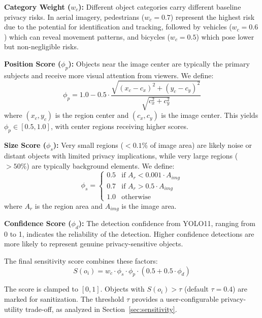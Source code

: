 \documentclass[preprint,12pt]{elsarticle}
\begin{document}
\textbf{Category Weight ($w_c$):} Different object categories carry different baseline privacy risks. In aerial imagery, pedestrians ($w_c = 0.7$) represent the highest risk due to the potential for identification and tracking, followed by vehicles ($w_c = 0.6$) which can reveal movement patterns, and bicycles ($w_c = 0.5$) which pose lower but non-negligible risks.

\textbf{Position Score ($\phi_p$):} Objects near the image center are typically the primary subjects and receive more visual attention from viewers. We define:
\begin{equation}
\phi_p = 1.0 - 0.5 \cdot \frac{\sqrt{(x_c - c_x)^2 + (y_c - c_y)^2}}{\sqrt{c_x^2 + c_y^2}}
\label{eq:position}
\end{equation}
where $(x_c, y_c)$ is the region center and $(c_x, c_y)$ is the image center. This yields $\phi_p \in [0.5, 1.0]$, with center regions receiving higher scores.

\textbf{Size Score ($\phi_s$):} Very small regions ($< 0.1\%$ of image area) are likely noise or distant objects with limited privacy implications, while very large regions ($> 50\%$) are typically background elements. We define:
\begin{equation}
\phi_s = \begin{cases}
0.5 & \text{if } A_r < 0.001 \cdot A_{img} \\
0.7 & \text{if } A_r > 0.5 \cdot A_{img} \\
1.0 & \text{otherwise}
\end{cases}
\label{eq:size}
\end{equation}
where $A_r$ is the region area and $A_{img}$ is the image area.

\textbf{Confidence Score ($\phi_d$):} The detection confidence from YOLO11, ranging from 0 to 1, indicates the reliability of the detection. Higher confidence detections are more likely to represent genuine privacy-sensitive objects.

The final sensitivity score combines these factors:
\begin{equation}
S(o_i) = w_c \cdot \phi_s \cdot \phi_p \cdot (0.5 + 0.5 \cdot \phi_d)
\label{eq:sensitivity}
\end{equation}

The score is clamped to $[0, 1]$. Objects with $S(o_i) > \tau$ (default $\tau = 0.4$) are marked for sanitization. The threshold $\tau$ provides a user-configurable privacy-utility trade-off, as analyzed in Section~\ref{sec:sensitivity}.
\end{document}
